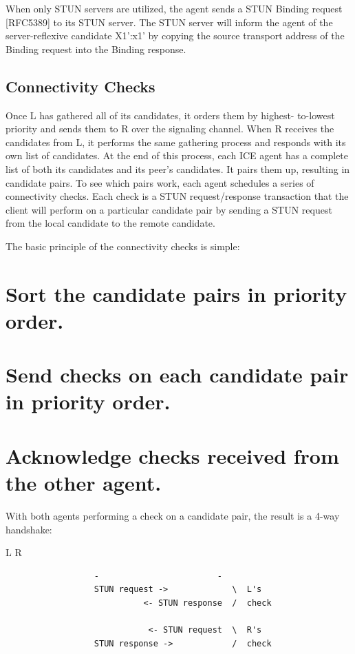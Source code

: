 \documentclass{article}
\begin{document}
When only STUN servers are utilized, the agent sends a STUN Binding request [RFC5389] to its STUN server.  The STUN server will inform the agent of the server-reflexive candidate X1':x1' by copying the source transport address of the Binding request into the Binding response.

\subsection{Connectivity Checks}

Once L has gathered all of its candidates, it orders them by highest- to-lowest priority and sends them to R over the signaling channel. When R receives the candidates from L, it performs the same gathering process and responds with its own list of candidates.  At the end of this process, each ICE agent has a complete list of both its candidates and its peer's candidates.  It pairs them up, resulting in candidate pairs.  To see which pairs work, each agent schedules a series of connectivity checks.  Each check is a STUN request/response transaction that the client will perform on a particular candidate pair by sending a STUN request from the local candidate to the remote candidate.

The basic principle of the connectivity checks is simple:

\section{Sort the candidate pairs in priority order.}

\section{Send checks on each candidate pair in priority order.}

\section{Acknowledge checks received from the other agent.}

With both agents performing a check on a candidate pair, the result is a 4-way handshake:

L                        R

\begin{verbatim}
                  -                        -
                  STUN request ->             \  L's
                            <- STUN response  /  check

                             <- STUN request  \  R's
                  STUN response ->            /  check

\end{verbatim}
\end{document}
